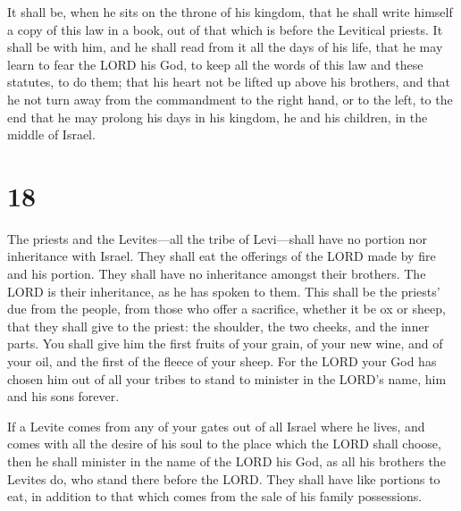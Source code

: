  It shall be, when he sits on the throne of his kingdom,
that he shall write himself a copy of this law in a book, out of that
which is before the Levitical priests.  It shall be with
him, and he shall read from it all the days of his life, that he may
learn to fear the LORD his God, to keep all the words of this law and
these statutes, to do them;  that his heart not be lifted
up above his brothers, and that he not turn away from the commandment to
the right hand, or to the left, to the end that he may prolong his days
in his kingdom, he and his children, in the middle of Israel.

\hypertarget{section-17}{%
\section{18}\label{section-17}}

 The priests and the Levites---all the tribe of Levi---shall
have no portion nor inheritance with Israel. They shall eat the
offerings of the LORD made by fire and his portion.  They
shall have no inheritance amongst their brothers. The LORD is their
inheritance, as he has spoken to them.  This shall be the
priests' due from the people, from those who offer a sacrifice, whether
it be ox or sheep, that they shall give to the priest: the shoulder, the
two cheeks, and the inner parts.  You shall give him the
first fruits of your grain, of your new wine, and of your oil, and the
first of the fleece of your sheep.  For the LORD your God
has chosen him out of all your tribes to stand to minister in the LORD's
name, him and his sons forever.

 If a Levite comes from any of your gates out of all Israel
where he lives, and comes with all the desire of his soul to the place
which the LORD shall choose,  then he shall minister in the
name of the LORD his God, as all his brothers the Levites do, who stand
there before the LORD.  They shall have like portions to
eat, in addition to that which comes from the sale of his family
possessions.

